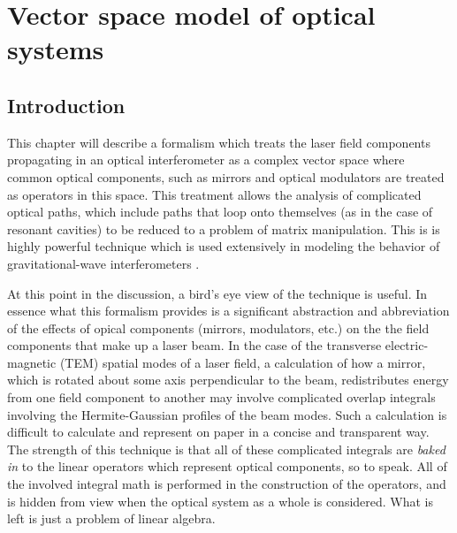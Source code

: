 \chapter{Vector space model of optical systems}

\section{Introduction}
This chapter will describe a formalism which treats the laser field components propagating in an optical interferometer as a complex vector space where common optical components, such as mirrors and optical modulators are treated as operators in this space. %
This treatment allows the analysis of complicated optical paths, which include paths that loop onto themselves (as in the case of resonant cavities) to be reduced to a problem of matrix manipulation. %
This is is highly powerful technique which is used extensively in modeling the behavior of gravitational-wave interferometers \cite{Vinet1986,Hefetz:97,Sigg:00}.

At this point in the discussion, a bird's eye view of the technique is useful. %
In essence what this formalism provides is a significant abstraction and abbreviation of the effects of opical components (mirrors, modulators, etc.) on the the field components that make up a laser beam. %
In the case of the transverse electric-magnetic (TEM) spatial modes of a laser field, a calculation of how a mirror, which is rotated about some axis perpendicular to the beam, redistributes energy from one field component to another may involve complicated overlap integrals involving the Hermite-Gaussian profiles of the beam modes. %
Such a calculation is difficult to calculate and represent on paper in a concise and transparent way. %
The strength of this technique is that all of these complicated integrals are \emph{baked in} to the linear operators which represent optical components, so to speak. %
All of the involved integral math is performed in the construction of the operators, and is hidden from view when the optical system as a whole is considered. %
What is left is just a problem of linear algebra.


